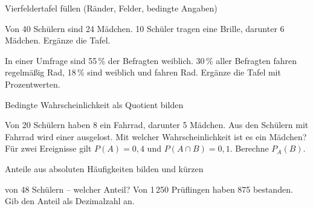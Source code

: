 \setcounter{aufgabe}{0}

\begin{aufgabe}{Vierfeldertafel füllen (Ränder, Felder, bedingte Angaben)}
\begin{teile}
\teil Von 40 Schülern sind 24 Mädchen. 10 Schüler tragen eine Brille, darunter 6 Mädchen. Ergänze die Tafel.

\teil In einer Umfrage sind 55\,\% der Befragten weiblich. 30\,\% aller Befragten fahren regelmäßig Rad, 18\,\% sind weiblich und fahren Rad. Ergänze die Tafel mit Prozentwerten.

\end{teile}
\end{aufgabe}

\begin{aufgabe}{Bedingte Wahrscheinlichkeit als Quotient bilden}
\begin{teile}
\teil Von 20 Schülern haben 8 ein Fahrrad, darunter 5 Mädchen. Aus den Schülern mit Fahrrad wird einer ausgelost. Mit welcher Wahrscheinlichkeit ist es ein Mädchen? \leerfeld
\teil Für zwei Ereignisse gilt $P(A) = 0{,}4$ und $P(A \cap B) = 0{,}1$. Berechne $P_A(B)$. \leerfeld
\end{teile}
\end{aufgabe}

\begin{aufgabe}{Anteile aus absoluten Häufigkeiten bilden und kürzen}
\begin{teile}
 von 48 Schülern – welcher Anteil? \leerfeld
\teil Von 1\,250 Prüflingen haben 875 bestanden. Gib den Anteil als Dezimalzahl an. \leerfeld
\end{teile}
\end{aufgabe}


